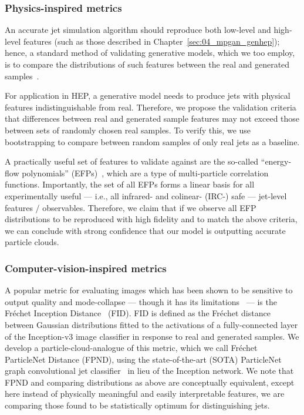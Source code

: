 \subsubsection{Physics-inspired metrics}

An accurate jet simulation algorithm should reproduce both low-level and high-level features (such as those described in Chapter~\ref{sec:04_mpgan_genhep}); hence, a standard method of validating generative models, which we too employ, is to compare the distributions of such features between the real and generated samples~\cite{deOliveira:2017pjk, Paganini:2017dwg, ATL-SOFT-PUB-2020-006, Erdmann:2018jxd, Carminati:2020kym, Sekmen:2016iql}.

For application in HEP, a generative model needs to produce jets with physical features indistinguishable from real.
Therefore, we propose the validation criteria that differences between real and generated sample features may not exceed those between sets of randomly chosen real samples.
To verify this, we use bootstrapping to compare between random samples of only real jets as a baseline.

A practically useful set of features to validate against are the so-called ``energy-flow polynomials'' (EFPs)~\cite{Komiske:2017aww}, which are a type of multi-particle correlation functions.
Importantly, the set of all EFPs forms a linear basis for all experimentally useful --- i.e., all infrared- and colinear- (IRC-) safe --- jet-level features / observables.
Therefore, we claim that if we observe all EFP distributions to be reproduced with high fidelity and to match the above criteria, we can conclude with strong confidence that our model is outputting accurate particle clouds.

\subsubsection{Computer-vision-inspired metrics}
A popular metric for evaluating images which has been shown to be sensitive to output quality and mode-collapse --- though it has its limitations~\cite{borji2021} --- is the Fr\'{e}chet Inception Distance~\cite{TTUR} (FID).
FID is defined as the Fr\'{e}chet distance between Gaussian distributions fitted to the activations of a fully-connected layer of the Inception-v3 image classifier in response to real and generated samples.
We develop a particle-cloud-analogue of this metric, which we call Fr\'{e}chet ParticleNet Distance (FPND), using the state-of-the-art (SOTA) ParticleNet graph convolutional jet classifier~\cite{Qu:2019gqs} in lieu of the Inception network.
We note that FPND and comparing distributions as above are conceptually equivalent, except here instead of physically meaningful and easily interpretable features, we are comparing those found to be statistically optimum for distinguishing jets.

